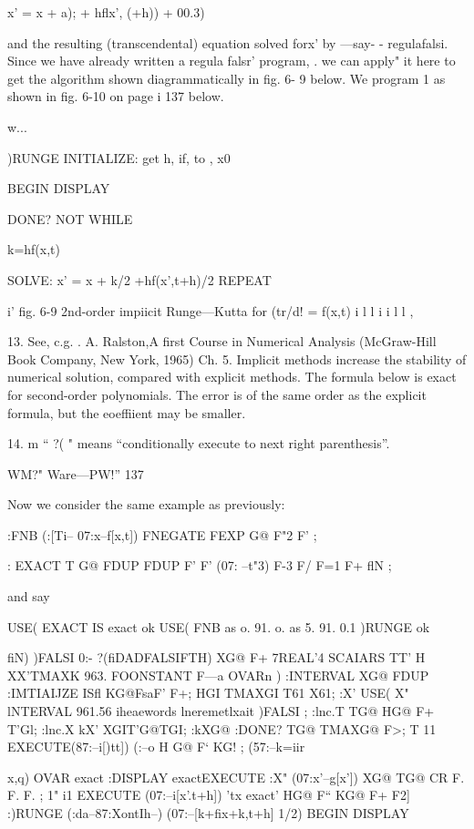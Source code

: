 {x’ = x + a); + hflx’, (+h)) + 00.3)

and the resulting (transcendental) equation solved forx’ by —say- -
regulafalsi. Since we have already written a regula falsr' program, .
we can apply" it here to get the algorithm shown diagrammatically
in fig. 6- 9 below. We program 1 as shown in fig. 6-10 on page i
137 below.

w...

 

 

)RUNGE
INITIALIZE: get h, if, to , x0

BEGIN DISPLAY

DONE? NOT
WHILE

k=hf(x,t)

SOLVE: x' = x + k/2 +hf(x’,t+h)/2
REPEAT

 

 

 

i’
fig. 6-9 2nd-order impiicit Runge—Kutta for (tr/d! = f(x,t) i
l
l
i
i
l
l
,

 

13. See, c.g. . A. Ralston,A first Course in Numerical Analysis (McGraw-Hill Book Company, New
York, 1965) Ch. 5. Implicit methods increase the stability of numerical solution, compared with
explicit methods. The formula below is exact for second-order polynomials. The error is of the
same order as the explicit formula, but the eoeffiient may be smaller.

14. m “ ?( " means “conditionally execute to next right parenthesis”.

WM?" Ware—PW!” 137

Now we consider the same example as previously:

:FNB (:[Ti-- 07:x--f[x,t])
FNEGATE FEXP G@ F"2 F' ;

: EXACT T G@ FDUP FDUP F' F' (07: --t"3)
F-3 F/ F=1 F+ flN ;

and say

USE( EXACT IS exact ok
USE( FNB as o. 91. o. as 5. 91. 0.1 )RUNGE ok

 

fiN) )FALSI 0:- ?(fiDADFALSIFTH) XG@ F+
7REAL'4 SCAIARS TT' H XX'TMAXK 963. FOONSTANT F—a
OVARn \tohoidciaotiou) :INTERVAL XG@ FDUP
:IMTIAIJZE ISfl KG@FsaF' F+;
HGI TMAXGI T61 X61;
:X' USE( X" lNTERVAL 961.56
\‘iheaewords lneremetlxait )FALSI ;
:lnc.T TG@ HG@ F+ T'Gl; :lnc.X kX’ XGIT'G@TGI;
:kXG@ :DONE? TG@ TMAXG@ F>;
T 11 EXECUTE(87:--i[)tt]) (:--o
H G@ F‘ KG! ; (57:--k=iir{x,q) OVAR exact \cia
:DISPLAY exactEXECUTE
:X" (07:x'--g[x’]) XG@ TG@ CR F. F. F. ;
1" i1 EXECUTE (07:--i[x'.t+h]) \eml'tx exact'
HG@ F“ KG@ F+ F2] :)RUNGE (:da--87:XontIh--)
(07:--[k+fix+k,t+h] 1/2) BEGIN DISPLAY

}}
